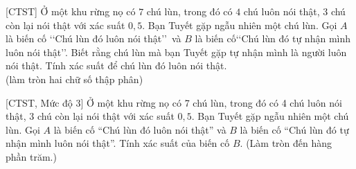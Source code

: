 \begin{bt}%
[CTST]%
Ở một khu rừng nọ có $7$ chú lùn, trong đó có $4$ chú luôn nói thật, $3$ chú còn lại nói thật với xác suất $0{,}5$. Bạn Tuyết gặp ngẫu nhiên một chú lùn. Gọi $A$ là biến cố \lq\lq Chú lùn đó luôn nói thật\rq\rq\, và $B$ là biến cố\lq\lq Chú lùn đó tự nhận mình luôn nói thật\rq\rq. Biết rằng chú lùn mà bạn Tuyết gặp tự nhận mình là người luôn nói thật. Tính xác suất để chú lùn đó luôn nói thật.\\
(làm tròn hai chữ số thập phân) 
\end{bt}

\begin{bt}%
[CTST, Mức độ 3]%
	Ở một khu rừng nọ có 7 chú lùn, trong đó có 4 chú luôn nói thật, 3 chú còn lại nói thật với 
	xác suất $0{,}5$. Bạn Tuyết gặp ngẫu nhiên một chú lùn. Gọi $A$ là biến cố ``Chú lùn đó luôn
	nói thật'' và $B$ là biến cố ``Chú lùn đó tự nhận mình luôn nói thật''. Tính xác suất của  biến cố  $B$. (Làm  tròn đến hàng phần trăm.) 
\end{bt}

